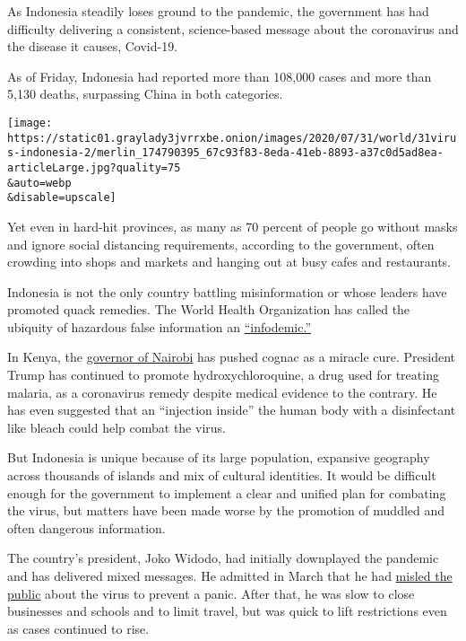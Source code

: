 As Indonesia steadily loses ground to the pandemic, the government has
had difficulty delivering a consistent, science-based message about the
coronavirus and the disease it causes, Covid-19.

As of Friday, Indonesia had reported more than 108,000 cases and more
than 5,130 deaths, surpassing China in both categories.

\texttt{[image: https://static01.graylady3jvrrxbe.onion/images/2020/07/31/world/31virus-indonesia-2/merlin\_174790395\_67c93f83-8eda-41eb-8893-a37c0d5ad8ea-articleLarge.jpg?quality=75\\\&auto=webp\\\&disable=upscale]}

Yet even in hard-hit provinces, as many as 70 percent of people go
without masks and ignore social distancing requirements, according to
the government, often crowding into shops and markets and hanging out at
busy cafes and restaurants.

Indonesia is not the only country battling misinformation or whose
leaders have promoted quack remedies. The World Health Organization has
called the ubiquity of hazardous false information an
\href{https://www.nytimes3xbfgragh.onion/2020/02/06/health/coronavirus-misinformation-social-media.html}{``infodemic.''}

In Kenya, the
\href{https://www.nytimes3xbfgragh.onion/2020/04/17/world/coronavirus-news-updates.html\#link-5699a22e}{governor
of Nairobi} has pushed cognac as a miracle cure. President Trump has
continued to promote hydroxychloroquine, a drug used for treating
malaria, as a coronavirus remedy despite medical evidence to the
contrary. He has even suggested that an ``injection inside'' the human
body with a disinfectant like bleach could help combat the virus.

But Indonesia is unique because of its large population, expansive
geography across thousands of islands and mix of cultural identities. It
would be difficult enough for the government to implement a clear and
unified plan for combating the virus, but matters have been made worse
by the promotion of muddled and often dangerous information.

The country's president, Joko Widodo, had initially downplayed the
pandemic and has delivered mixed messages. He admitted in March that he
had
\href{https://www.nytimes3xbfgragh.onion/2020/03/17/world/asia/coronavirus-southeast-asia.html}{misled
the public} about the virus to prevent a panic. After that, he was slow
to close businesses and schools and to limit travel, but was quick to
lift restrictions even as cases continued to rise.


